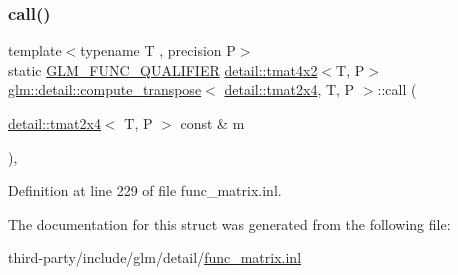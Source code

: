 \subsubsection{\texorpdfstring{call()}{call()}}
{\footnotesize\ttfamily template$<$typename T , precision P$>$ \\
static \hyperlink{setup_8hpp_a33fdea6f91c5f834105f7415e2a64407}{G\+L\+M\+\_\+\+F\+U\+N\+C\+\_\+\+Q\+U\+A\+L\+I\+F\+I\+ER} \hyperlink{structglm_1_1detail_1_1tmat4x2}{detail\+::tmat4x2}$<$T, P$>$ \hyperlink{structglm_1_1detail_1_1compute__transpose}{glm\+::detail\+::compute\+\_\+transpose}$<$ \hyperlink{structglm_1_1detail_1_1tmat2x4}{detail\+::tmat2x4}, T, P $>$\+::call (\begin{DoxyParamCaption}\item[{\hyperlink{structglm_1_1detail_1_1tmat2x4}{detail\+::tmat2x4}$<$ T, P $>$ const \&}]{m }\end{DoxyParamCaption})\hspace{0.3cm}{\ttfamily [inline]}, {\ttfamily [static]}}



Definition at line 229 of file func\+\_\+matrix.\+inl.



The documentation for this struct was generated from the following file\+:\begin{DoxyCompactItemize}
\item 
third-\/party/include/glm/detail/\hyperlink{func__matrix_8inl}{func\+\_\+matrix.\+inl}\end{DoxyCompactItemize}
